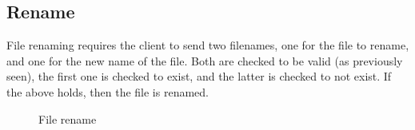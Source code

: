 \subsection{Rename}
File renaming requires the client to send two filenames, one for the file to rename, and one for the new name of the file. Both are checked to be valid (as previously seen), the first one is checked to exist, and the latter is checked to not exist. If the above holds, then the file is renamed.
\begin{figure}
    \centering
    \setlength{\instdist}{8.5cm}
    \setmscoptions
    \begin{msc}{}



        \nextlevel[2]

        \nextlevel[4]

        \nextlevel

        \nextlevel[4]

        \nextlevel
    \end{msc}
    \centering
    \caption{File rename}
    \label{fig:transport_protocol_file_rename}
\end{figure}

